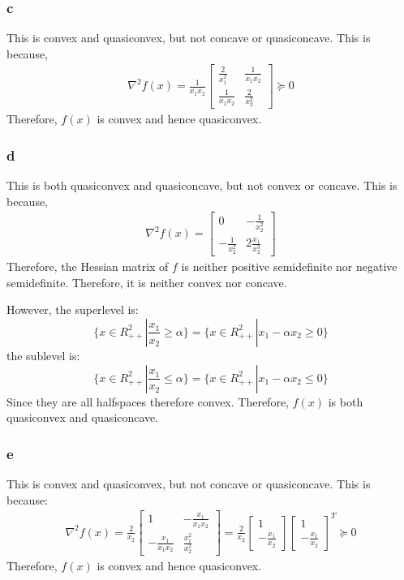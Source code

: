 \documentclass[10pt,a4paper]{article}
\begin{document}
\subsubsection{c}
This is convex and quasiconvex, but not concave or quasiconcave. This is because,
\begin{align*}
\nabla^2f(x)=\frac{1}{x_1x_2}\begin{bmatrix}
\frac{2}{x_1^2} & \frac{1}{x_1x_2}\\
\frac{1}{x_1x_2} & \frac{2}{x_2^2}
\end{bmatrix}\succeq 0
\end{align*}
Therefore, $f(x)$ is convex and hence quasiconvex.

\subsubsection{d}
This is both quasiconvex and quasiconcave, but not convex or concave. This is because,
\begin{align*}
\nabla^2f(x)=\begin{bmatrix}
0 & -\frac{1}{x_2^2}\\
-\frac{1}{x_2^2} & 2\frac{x_1}{x_2^3}
\end{bmatrix}
\end{align*}
Therefore, the Hessian matrix of $f$ is neither positive semidefinite nor negative semidefinite. Therefore, it is neither convex nor concave. 

However, the superlevel is:
$$
\{x\in R^2_{++}|\frac{x_1}{x_2}\geq \alpha\}=\{x\in R^2_{++}|x_1 - \alpha x_2\geq 0\}
$$
the sublevel is:
$$
\{x\in R^2_{++}|\frac{x_1}{x_2}\leq \alpha\}=\{x\in R^2_{++}|x_1 - \alpha x_2\leq 0\}
$$
Since they are all halfspaces therefore convex. Therefore,  $f(x)$ is both quasiconvex and quasiconcave.

\subsubsection{e}
This is convex and quasiconvex, but not concave or quasiconcave. This is because:
\begin{align*}
\nabla^2f(x)=\frac{2}{x_2}\begin{bmatrix}
1 & -\frac{x_1}{x_1x_2}\\
-\frac{x_1}{x_1x_2} & \frac{x_1^2}{x_2^2}
\end{bmatrix}=\frac{2}{x_2}\begin{bmatrix}
1\\
-\frac{x_1}{x_2}
\end{bmatrix}
\begin{bmatrix}
1\\
-\frac{x_1}{x_2}
\end{bmatrix}^T
\succeq 0
\end{align*}
Therefore, $f(x)$ is convex and hence quasiconvex.
\end{document}

